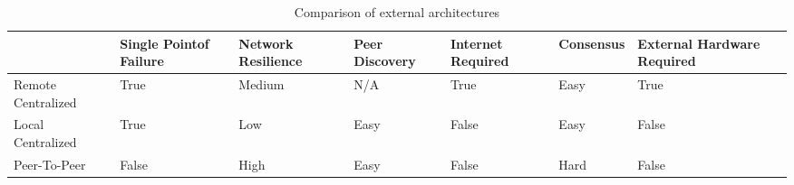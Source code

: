 \begin{table}
\centering
\footnotesize
\begin{tabularx}{\textwidth}{lXXXXXX}\toprule
    & Single Point\newline of Failure & Network Resilience & Peer \newline Discovery & Internet Required & Consensus & External Hardware Required \\\midrule
Remote Centralized & True                    & Medium              & N/A            & True              & Easy      & True                          \\
Local Centralized  & True                    & Low                 & Easy           & False             & Easy      & False                         \\
Peer-To-Peer     & False                   & High                & Easy           & False             & Hard      & False                         \\\bottomrule
\end{tabularx}
\caption{Comparison of external architectures}
\label{tbl:external_comparison}
\end{table}
